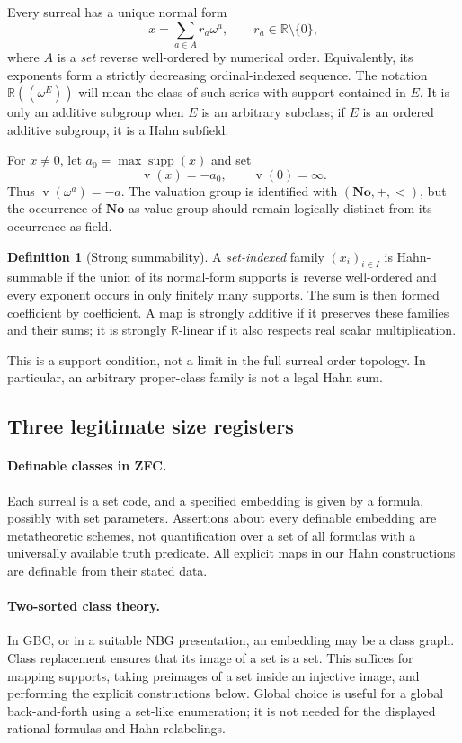 \documentclass[11pt,a4paper]{article}
\numberwithin{equation}{section}
\theoremstyle{plain}
\theoremstyle{definition}
\newtheorem{definition}[theorem]{Definition}
\theoremstyle{remark}
\newcommand{\No}{\mathbf{No}}
\newcommand{\R}{\mathbb{R}}
\newcommand{\supp}{\operatorname{supp}}
\newcommand{\NF}[1]{\R((\omega^{#1}))}
\newcommand{\val}{\operatorname{v}}
\begin{document}
Every surreal has a unique normal form
\begin{equation}\label{sse:eq:nf}
 x=\sum_{a\in A}r_a\omega^a,
 \qquad r_a\in\R\setminus\{0\},
\end{equation}
where $A$ is a \emph{set} reverse well-ordered by numerical order. Equivalently,
its exponents form a strictly decreasing ordinal-indexed sequence. The
notation $\NF{E}$ will mean the class of such series with support contained
in $E$. It is only an additive subgroup when $E$ is an arbitrary subclass;
if $E$ is an ordered additive subgroup, it is a Hahn subfield.

For $x\ne0$, let $a_0=\max\supp(x)$ and set
\begin{equation}\label{sse:eq:valuation}
 \val(x)=-a_0,\qquad \val(0)=\infty.
\end{equation}
Thus $\val(\omega^a)=-a$. The valuation group is identified with
$(\No,+,<)$, but the occurrence of $\No$ as value group should remain
logically distinct from its occurrence as field.

\begin{definition}[Strong summability]
A \emph{set-indexed} family $(x_i)_{i\in I}$ is Hahn-summable if the union of
its normal-form supports is reverse well-ordered and every exponent
occurs in only finitely many supports. The sum is then formed coefficient
by coefficient. A map is strongly additive if it preserves these families
and their sums; it is strongly $\R$-linear if it also respects real scalar
multiplication.
\end{definition}
This is a support condition, not a limit in the full surreal order topology.
In particular, an arbitrary proper-class family is not a legal Hahn sum.

\subsection{Three legitimate size registers}
\paragraph{Definable classes in ZFC.}
Each surreal is a set code, and a specified embedding is given by a formula,
possibly with set parameters. Assertions about every definable embedding
are metatheoretic schemes, not quantification over a set of all formulas
with a universally available truth predicate. All explicit maps in our
Hahn constructions are definable from their stated data.

\paragraph{Two-sorted class theory.}
In GBC, or in a suitable NBG presentation, an embedding may be a class graph.
Class replacement ensures that its image of a set is a set. This suffices
for mapping supports, taking preimages of a set inside an injective image,
and performing the explicit constructions below. Global choice is useful
for a global back-and-forth using a set-like enumeration; it is not needed
for the displayed rational formulas and Hahn relabelings.
\end{document}
